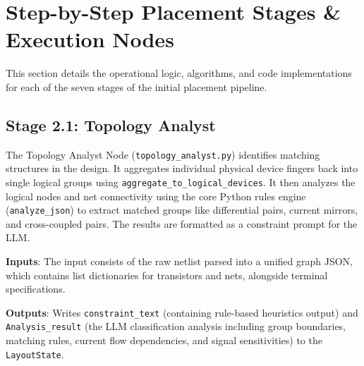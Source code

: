 \section[Placement Stages]{Step-by-Step Placement Stages \& Execution Nodes}
\label{sec:placement_stages}

This section details the operational logic, algorithms, and code implementations for each of the seven stages of the initial placement pipeline.

\subsection{Stage 2.1: Topology Analyst}
The Topology Analyst Node (\texttt{topology\_analyst.py}) identifies matching structures in the design. It aggregates individual physical device fingers back into single logical groups using \texttt{aggregate\_to\_logical\_devices}. It then analyzes the logical nodes and net connectivity using the core Python rules engine (\texttt{analyze\_json}) to extract matched groups like differential pairs, current mirrors, and cross-coupled pairs. The results are formatted as a constraint prompt for the LLM.

\textbf{Inputs}: The input consists of the raw netlist parsed into a unified graph JSON, which contains list dictionaries for transistors and nets, alongside terminal specifications.

\textbf{Outputs}: Writes \texttt{constraint\_text} (containing rule-based heuristics output) and \texttt{Analysis\_result} (the LLM classification analysis including group boundaries, matching rules, current flow dependencies, and signal sensitivities) to the \texttt{LayoutState}.

